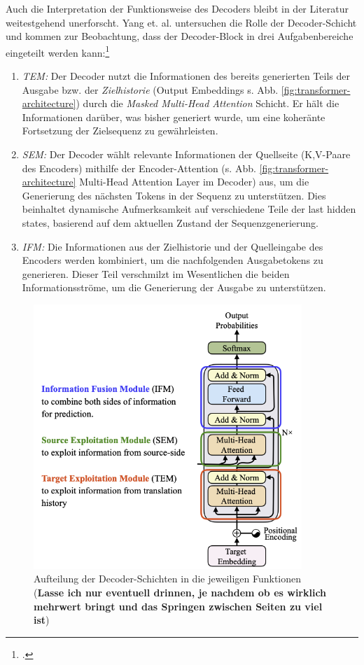 Auch die Interpretation der Funktionsweise des Decoders bleibt in der Literatur weitestgehend unerforscht. Yang et. al. untersuchen die Rolle der Decoder-Schicht und kommen zur Beobachtung, dass der Decoder-Block in drei Aufgabenbereiche eingeteilt werden kann:\footcites[Vgl.][S. 2]{yang_sub-layer_2020}
\begin{enumerate}[1.]
    \item \emph{\ac{TEM}:} Der Decoder nutzt die Informationen des bereits generierten Teils der Ausgabe bzw. der \emph{Zielhistorie} (Output Embeddings s. Abb. \ref{fig:transformer-architecture}) durch die \emph{Masked Multi-Head Attention} Schicht. Er hält die Informationen darüber, was bisher generiert wurde, um eine koheränte Fortsetzung der Zielsequenz zu gewährleisten.
    \item \emph{\ac{SEM}:} Der Decoder wählt relevante Informationen der Quellseite (K,V-Paare des Encoders) mithilfe der Encoder-Attention (s. Abb. \ref{fig:transformer-architecture} Multi-Head Attention Layer im Decoder) aus, um die Generierung des nächsten Tokens in der Sequenz zu unterstützen. Dies beinhaltet dynamische Aufmerksamkeit auf verschiedene Teile der last hidden states, basierend auf dem aktuellen Zustand der Sequenzgenerierung.
    \item \emph{\ac{IFM}:} Die Informationen aus der Zielhistorie und der Quelleingabe des Encoders werden kombiniert, um die nachfolgenden Ausgabetokens zu generieren. Dieser Teil verschmilzt im Wesentlichen die beiden Informationsströme, um die Generierung der Ausgabe zu unterstützen.
\end{enumerate}
\begin{figure}
    \centering
    \includegraphics[height=100mm]{graphics/decoder layers explained.png}
    \caption[Aufteilung der Decoder-Schichten in die jeweiligen Funktionen]{Aufteilung der Decoder-Schichten in die jeweiligen Funktionen (\textbf{Lasse ich nur eventuell drinnen, je nachdem ob es wirklich mehrwert bringt und das Springen zwischen Seiten zu viel ist})\footnotemark}
    \label{fig:decoder-layers}
\end{figure}


